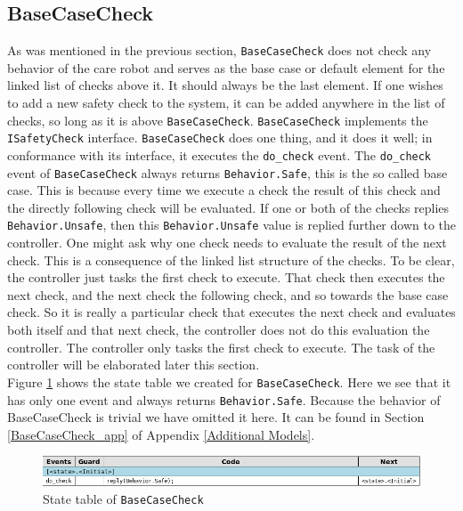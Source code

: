 \documentclass[12pt]{scrreprt}
\begin{document}
\begin{appendices}
\subsection{BaseCaseCheck}
As was mentioned in the previous section, \texttt{BaseCaseCheck} does not check any behavior of the care robot and serves as the base case or default element for the linked list of checks above it. It should always be the last element. If one wishes to add a new safety check to the system, it can be added anywhere in the list of checks, so long as it is above \texttt{BaseCaseCheck}. \texttt{BaseCaseCheck} implements the \texttt{ISafetyCheck} interface. \texttt{BaseCaseCheck} does one thing, and it does it well; in conformance with its interface, it executes the \texttt{do\_check} event. The \texttt{do\_check} event of \texttt{BaseCaseCheck} always returns \texttt{Behavior.Safe}, this is the so called base case. This is because every time we execute a check the result of this check and the directly following check will be evaluated. If one or both of the checks replies \texttt{Behavior.Unsafe}, then this \texttt{Behavior.Unsafe} value is replied further down to the controller. One might ask why one check needs to evaluate the result of the next check. This is a consequence of the linked list structure of the checks. To be clear, the controller just tasks the first check to execute. That check then executes the next check, and the next check the following check, and so towards the base case check. So it is really a particular check that executes the next check and evaluates both itself and that next check, the controller does not do this evaluation the controller. The controller only tasks the first check to execute. The task of the controller will be elaborated later this section. 
\\
Figure \ref{fig:basecasechekc_state_table} shows the state table we created for \texttt{BaseCaseCheck}. Here we see that it has only one event and always returns \texttt{Behavior.Safe}. Because the behavior of BaseCaseCheck is trivial we have omitted it here. It can be found in Section \ref{BaseCaseCheck_app} of Appendix \ref{Additional Models}.

\begin{figure}[H]
    \centering
    \includegraphics[width=\textwidth]{Figures/results/modelling_figures/BaseCaseCheck/BaseCaseCheck_state_table.png}
    \caption{State table of \texttt{BaseCaseCheck}}
    \label{fig:basecasechekc_state_table}
\end{figure}


\end{appendices}
\end{document}
